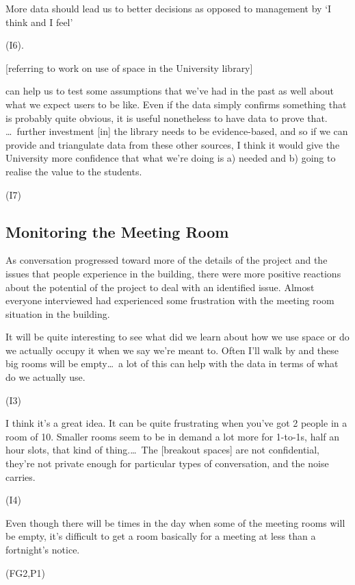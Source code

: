 \begin{qt}More data should lead us to better decisions as opposed to management by ‘I think and I feel’\end{qt} (I6).

[referring to work on use of space in the University
library]\begin{qt} can help us to test some
  assumptions that we’ve had in the past as well about what we expect
  users to be like. Even if the data simply confirms something that is
  probably quite obvious, it is useful nonetheless to have data to
  prove that. \ldots\ further investment [in] the library needs to be
  evidence-based, and so if we can provide and triangulate data from
  these other sources, I think it would give the University more
  confidence that what we’re doing is a) needed and b) going to
  realise the value to the students.\end{qt} (I7)

\subsection{Monitoring the Meeting Room}
As conversation progressed toward more of the details of the
project and the issues that people experience in the building, there
were more positive reactions about the potential of the project to
deal with an identified issue. Almost everyone interviewed had
experienced some frustration with the meeting room situation in the
building.

\begin{qt}It will be quite interesting to see what did we learn about how we use space or do we actually
occupy it when we say we’re meant to. Often I’ll walk by and these
big rooms will be empty\ldots\  a lot of this can help with the
data in terms of what do we actually use.\end{qt} (I3)

\begin{qt}I think it’s a great idea. It can be quite frustrating
when you’ve got 2 people in a room of 10. Smaller rooms seem to be in
demand a lot more for 1-to-1s, half an hour slots, that kind of
thing.\ldots\  The [breakout spaces] are not confidential, they’re not
private enough for particular types of conversation, and the noise
carries.\end{qt} (I4)

\begin{qt}Even though there will be times in the day
when some of the meeting rooms will be empty, it’s difficult to get a room basically for a meeting at
less than a fortnight’s notice.\end{qt} (FG2,P1)

